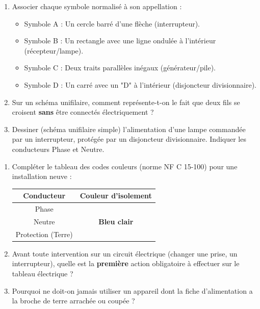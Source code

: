 \documentclass[11pt]{article}
\begin{document}
\begin{exercice}
\begin{enumerate}
    \item Associer chaque symbole normalisé à son appellation :
    \begin{itemize}
        \item Symbole A : Un cercle barré d'une flèche (interrupteur).
        \item Symbole B : Un rectangle avec une ligne ondulée à l'intérieur (récepteur/lampe).
        \item Symbole C : Deux traits parallèles inégaux (générateur/pile).
        \item Symbole D : Un carré avec un "D" à l'intérieur (disjoncteur divisionnaire).
    \end{itemize}
    \item Sur un schéma unifilaire, comment représente-t-on le fait que deux fils se croisent \textbf{sans} être connectés électriquement ?
    \item Dessiner (schéma unifilaire simple) l'alimentation d'une lampe commandée par un interrupteur, protégée par un disjoncteur divisionnaire. Indiquer les conducteurs Phase et Neutre.
\end{enumerate}
\end{exercice}

\begin{exercice}
\begin{enumerate}
    \item Compléter le tableau des codes couleurs (norme NF C 15-100) pour une installation neuve :
    \begin{tabular}{|c|c|}
    \hline
    \textbf{Conducteur} & \textbf{Couleur d'isolement} \\
    \hline
    Phase & \\
    \hline
    Neutre & \textbf{Bleu clair} \\
    \hline
    Protection (Terre) & \\
    \hline
    \end{tabular}
    \item Avant toute intervention sur un circuit électrique (changer une prise, un interrupteur), quelle est la \textbf{première} action obligatoire à effectuer sur le tableau électrique ?
    \item Pourquoi ne doit-on jamais utiliser un appareil dont la fiche d'alimentation a la broche de terre arrachée ou coupée ?
\end{enumerate}
\end{exercice}
\end{document}
